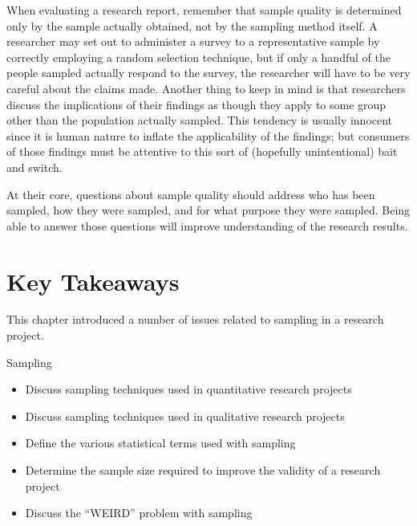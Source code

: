 When evaluating a research report, remember that sample quality is determined only by the sample actually obtained, not by the sampling method itself. A researcher may set out to administer a survey to a representative sample by correctly employing a random selection technique, but if only a handful of the people sampled actually respond to the survey, the researcher will have to be very careful about the claims made. Another thing to keep in mind is that researchers discuss the implications of their findings as though they apply to some group other than the population actually sampled. This tendency is usually innocent since it is human nature to inflate the applicability of the findings; but consumers of those findings must be attentive to this sort of (hopefully unintentional) bait and switch. 

At their core, questions about sample quality should address who has been sampled, how they were sampled, and for what purpose they were sampled. Being able to answer those questions will improve understanding of the research results.

\section{Key Takeaways}

This chapter introduced a number of issues related to sampling in a research project. 

\begin{center}
	\begin{tkawybox}{Sampling}
		\begin{itemize}
			\setlength{\itemsep}{0pt}
			\setlength{\parskip}{0pt}
			\setlength{\parsep}{0pt}
			
			\item Discuss sampling techniques used in quantitative research projects
			\item Discuss sampling techniques used in qualitative research 		projects
			\item Define the various statistical terms used with sampling
			\item Determine the sample size required to improve the validity of a research project
			\item Discuss the ``WEIRD'' problem with sampling
		\end{itemize}
	\end{tkawybox}
\end{center}
